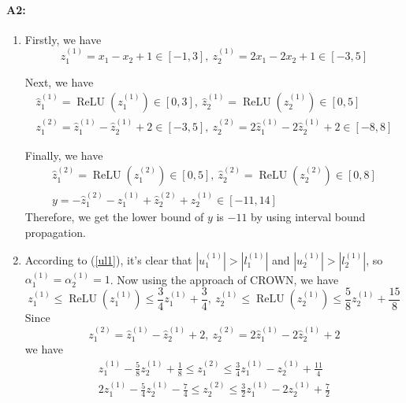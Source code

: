 \documentclass[12pt]{article}
\newcommand{\var}[3]{#1_{#2}^{(#3)}}
\newcommand{\relu}[1]{\operatorname{ReLU}\left(#1\right)}
\begin{document}
\paragraph{A2:}
\begin{enumerate}[1.]
\item Firstly, we have
	\begin{equation}
		\label{ul1}
		\var{z}{1}{1} = x_{1} - x_{2} + 1 \in [-1, 3], \ \var{z}{2}{1} = 2 x_{1} - 2 x_{2} + 1 \in [-3, 5]
	\end{equation}
	
	Next, we have
	\begin{equation}
	\begin{gathered}
		\var{\hat{z}}{1}{1} = \relu{\var{z}{1}{1}} \in [0, 3], \ \var{\hat{z}}{2}{1} = \relu{\var{z}{2}{1}} \in [0, 5]\\
		\var{z}{1}{2} = \var{\hat{z}}{1}{1} - \var{\hat{z}}{2}{1} + 2 \in [-3, 5], \ \var{z}{2}{2} = 2 \var{\hat{z}}{1}{1} - 2 \var{\hat{z}}{2}{1} + 2 \in [-8, 8]
	\end{gathered}
	\end{equation}
	
	Finally, we have
	\begin{equation}
	\begin{gathered}
		\var{\hat{z}}{1}{2} = \relu{\var{z}{1}{2}} \in [0, 5], \ \var{\hat{z}}{2}{2} = \relu{\var{z}{2}{2}} \in [0, 8]\\
		y = -\var{\hat{z}}{1}{2} - \var{z}{1}{1} + \var{\hat{z}}{2}{2} + \var{z}{2}{1} \in [-11, 14]
	\end{gathered}
	\end{equation} 
	Therefore, we get the lower bound of $y$ is $-11$ by using interval bound propagation.

\item According to (\ref{ul1}), it's clear that $|\var{u}{1}{1}| > |\var{l}{1}{1}|$ and $|\var{u}{2}{1}| > |\var{l}{2}{1}| $, so $\var{\alpha}{1}{1} = \var{\alpha}{2}{1} = 1$. Now using the approach of CROWN, we have
	\begin{equation}
		\var{z}{1}{1} \leqslant \relu{\var{z}{1}{1}} \leqslant \frac{3}{4} \var{z}{1}{1} + \frac{3}{4}, \ \var{z}{2}{1} \leqslant \relu{\var{z}{2}{1}} \leqslant \frac{5}{8} \var{z}{2}{1} + \frac{15}{8}
	\end{equation}
	Since
	\begin{equation}
		\var{z}{1}{2} = \var{\hat{z}}{1}{1} - \var{\hat{z}}{2}{1} + 2, \ \var{z}{2}{2} = 2 \var{\hat{z}}{1}{1} - 2 \var{\hat{z}}{2}{1} + 2
	\end{equation}
	we have
	\begin{equation}
	\begin{gathered}
		\var{z}{1}{1} - \frac{5}{8} \var{z}{2}{1} + \frac{1}{8} \leqslant \var{z}{1}{2} \leqslant \frac{3}{4} \var{z}{1}{1} - \var{z}{2}{1} + \frac{11}{4}\\
		2 \var{z}{1}{1} - \frac{5}{4} \var{z}{2}{1} - \frac{7}{4} \leqslant \var{z}{2}{2} \leqslant \frac{3}{2} \var{z}{1}{1} - 2 \var{z}{2}{1} + \frac{7}{2}
	\end{gathered}
	\end{equation}
	

\end{enumerate}
\end{document}
